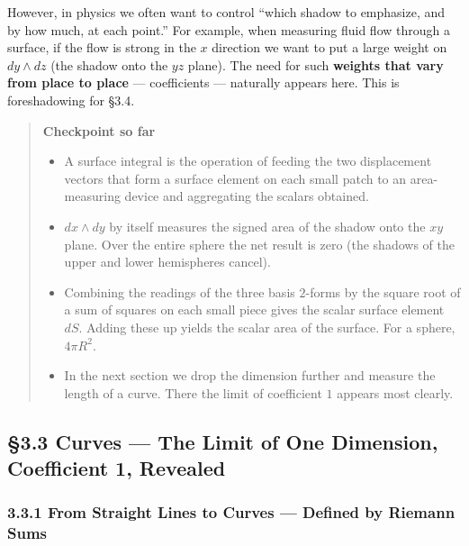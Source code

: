 \documentclass[a4paper,12pt,openany]{book}
\begin{document}
However, in physics we often want to control ``which shadow to
emphasize, and by how much, at each point.'' For example, when measuring
fluid flow through a surface, if the flow is strong in the \(x\)
direction we want to put a large weight on \(dy \wedge dz\) (the shadow
onto the \(yz\) plane). The need for such
\textbf{weights that vary from place to place} — coefficients —
naturally appears here. This is foreshadowing for §3.4.

\begin{quote}
\textbf{Checkpoint so far}

\begin{itemize}
\item
  A surface integral is the operation of feeding the two displacement
  vectors that form a surface element on each small patch to an
  area-measuring device and aggregating the scalars obtained.
\item
  \(dx \wedge dy\) by itself measures the signed area of the shadow onto
  the \(xy\) plane. Over the entire sphere the net result is zero (the
  shadows of the upper and lower hemispheres cancel).
\item
  Combining the readings of the three basis \(2\)-forms by the square
  root of a sum of squares on each small piece gives the scalar surface
  element \(dS\). Adding these up yields the scalar area of the surface.
  For a sphere, \(4\pi R^2\).
\item
  In the next section we drop the dimension further and measure the
  length of a curve. There the limit of coefficient \(1\) appears most
  clearly.
\end{itemize}
\end{quote}

\par\vspace{0.35em}\par

\hypertarget{curves-the-limit-of-one-dimension-coefficient-1-revealed}{%
\subsection{§3.3 Curves — The Limit of One Dimension, Coefficient 1,
Revealed}\label{curves-the-limit-of-one-dimension-coefficient-1-revealed}}

\hypertarget{from-straight-lines-to-curves-defined-by-riemann-sums}{%
\subsubsection{3.3.1 From Straight Lines to Curves — Defined by
Riemann
Sums}\label{from-straight-lines-to-curves-defined-by-riemann-sums}}
\end{document}
